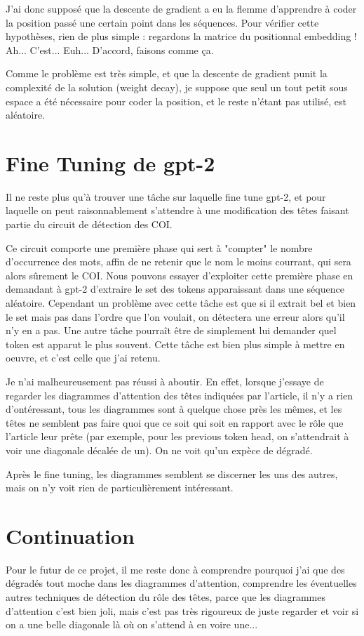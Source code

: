 \documentclass{article}
\begin{document}
J'ai donc supposé que la descente de gradient a eu la flemme d'apprendre à coder la position passé une certain point dans les séquences. Pour vérifier cette hypothèses, rien de plus simple : regardons la matrice du positionnal embedding ! Ah... C'est... Euh... D'accord, faisons comme ça.

Comme le problème est très simple, et que la descente de gradient punit la complexité de la solution (weight decay), je suppose que seul un tout petit sous espace a été nécessaire pour coder la position, et le reste n'étant pas utilisé, est aléatoire.

\section{Fine Tuning de gpt-2}

Il ne reste plus qu'à trouver une tâche sur laquelle fine tune gpt-2, et pour laquelle on peut raisonnablement s'attendre à une modification des têtes faisant partie du circuit de détection des COI.

Ce circuit comporte une première phase qui sert à "compter" le nombre d'occurrence des mots, affin de ne retenir que le nom le moins courrant, qui sera alors sûrement le COI. Nous pouvons essayer d'exploiter cette première phase en demandant à gpt-2 d'extraire le set des tokens apparaissant dans une séquence aléatoire. Cependant un problème avec cette tâche est que si il extrait bel et bien le set mais pas dans l'ordre que l'on voulait, on détectera une erreur alors qu'il n'y en a pas. Une autre tâche pourraît être de simplement lui demander quel token est apparut le plus souvent. Cette tâche est bien plus simple à mettre en oeuvre, et c'est celle que j'ai retenu.\newline

Je n'ai malheureusement pas réussi à aboutir. En effet, lorsque j'essaye de regarder les diagrammes d'attention des têtes indiquées par l'article, il n'y a rien d'ontéressant, tous les diagrammes sont à quelque chose près les mêmes, et les têtes ne semblent pas faire quoi que ce soit qui soit en rapport avec le rôle que l'article leur prête (par exemple, pour les previous token head, on s'attendrait à voir une diagonale décalée de un). On ne voit qu'un expèce de dégradé.

Après le fine tuning, les diagrammes semblent se discerner les uns des autres, mais on n'y voit rien de particulièrement intéressant.

\section{Continuation}
Pour le futur de ce projet, il me reste donc à comprendre pourquoi j'ai que des dégradés tout moche dans les diagrammes d'attention, comprendre les éventuelles autres techniques de détection du rôle des têtes, parce que les diagrammes d'attention c'est bien joli, mais c'est pas très rigoureux de juste regarder et voir si on a une belle diagonale là où on s'attend à en voire une...
\end{document}
